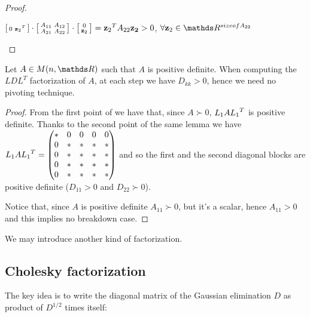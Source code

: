 \documentclass[computationalMathematics.tex]{subfiles}
\begin{document}
\begin{proof}
\begin{enumerate}
\begin{description}
      $\begin{bsmallmatrix}
        0& {\mathbf{z}_2}^{T}\\
      \end{bsmallmatrix} 
      \cdot 
      \begin{bsmallmatrix}
	      A_{11} & A_{12}\\
	      A_{21} & A_{22}
      \end{bsmallmatrix}
      \cdot 
      \begin{bsmallmatrix}
        0\\\mathbf{z}_2
      \end{bsmallmatrix}
      = {\mathbf{z}_2}^{T} A_{22} \mathbf{z_2} > 0$, $\forall \mathbf{z}_2 \in \R^{size of A_{22}}$
 
  \end{description}
   \end{enumerate}
\end{proof}

\begin{corollary}
  Let $A \in M(n, \R)$ such that $A$ is positive definite. When computing the $LDL^T$ factorization of $A$, at each step we have $D_{kk}>0$, hence we need no pivoting technique.
\end{corollary}

\begin{proof}
  From the first point of  we have that, since $A {\succ} 0$, $L_1 A {L_1}^{T}$ is positive definite. Thanks to the second point of the same lemma we have $L_1 A {L_1}^{T} = 
\begin{pmatrix}
    \ast & 0 & 0 & 0 & 0\\
    0 & \ast & \ast & \ast & \ast\\
    0 & \ast & \ast & \ast & \ast\\
    0 & \ast & \ast & \ast & \ast\\
    0 & \ast & \ast & \ast & \ast\\
\end{pmatrix}$ and so the first and the second diagonal blocks are positive definite ($D_{11} > 0$ and $D_{22} {\succ} 0$).

  Notice that, since $A$ is positive definite $A_{11} {\succ} 0$, but it's a scalar, hence $A_{11} > 0$ and this implies no breakdown case.
\end{proof}

We may introduce another kind of factorization.

\subsection{Cholesky factorization}
The key idea is to write the diagonal matrix of the Gaussian elimination $D$ as product of $D^{1/2}$ times itself:
\end{document}
